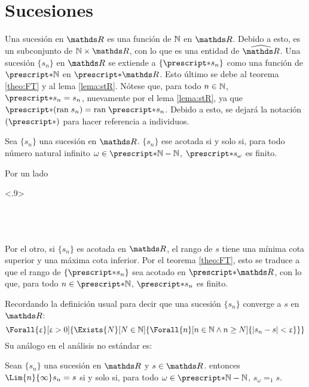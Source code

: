 \section{Sucesiones}

Una sucesión en $\R$ es una función de $\mathbb{N}$ en $\R$. Debido a esto, es
un subconjunto de $\N\times\R$, con lo que es una entidad de $\Rh$.
Una sucesión $\{s_n\}$ en $\R$ se extiende a $\{\st{s_n}\}$ como una función de 
$\st{\N}$ en $\st{\R}$. Esto último se debe al teorema \ref{theo:FT} y
al lema \ref{lema:stR}. Nótese que, para todo $n\in\mathbb{N}$, $\st{s_n} = s_n$,
nuevamente por el lema \ref{lema:stR}, ya que $\st{(\ran s_n)} = \ran \st{s_n}$.
Debido a esto, se dejará la notación $(\st{})$ para hacer referencia a
individuos.

\begin{theorem}
  Sea $\{s_n\}$ una sucesión en $\R$. $\{s_n\}$ ese acotada si y solo si, para todo
  número natural infinito $\omega\in\st{\N}-\N$, $\st{s_\omega}$ es
  finito.
\end{theorem}

\begin{demo}
  Por un lado
  \begin{longderivation}<.9>
      \\
    \\
      \\
    \equiv\\
  \end{longderivation}
  Por el otro, si $\{s_n\}$ es acotada en $\R$, el rango de $s$ tiene una
  mínima cota superior y una máxima cota inferior. Por el teorema
  \ref{theo:FT}, esto se traduce a que el rango de $\{\st{s_n}\}$ sea acotado
  en $\st{\R}$, con lo que, para todo $n\in\st{\N}$, $\st{s_n}$ es finito.
\end{demo}

Recordando la definición usual para decir que una sucesión $\{s_n\}$
converge a $s$ en $\R$:
\[\Forall{\e}[\e>0]{\Exists{N}[N\in\N]{\Forall{n}[n\in\N \land n\geq N]{|s_n - s| < \e}}}\]
Su análogo en el análisis no estándar es:
\begin{theorem}
  Sean $\{s_n\}$ una sucesión en $\R$ y $s\in\R$. entonces 
  $\Lim{n}{\infty} s_n = s$ si y solo si, para todo $\omega\in\st{\N} - \N$,
  $s_\omega =_1 s$.
\end{theorem}

